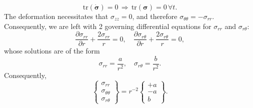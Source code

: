 \documentclass[12pt]{article}
\begin{document}
\begin{equation}
  \text{tr} (\dot{\boldsymbol{\sigma}}) = 0 \, \Rightarrow \, \text{tr} (\boldsymbol{\sigma}) = 0 \, \forall t.
\end{equation}
The deformation necessitates that $\sigma_{zz} = 0$, and therefore $\sigma_{\theta \theta} = - \sigma_{rr}$. Consequently, we are left with 2 governing differential equations for $\sigma_{rr}$ and $\sigma_{r \theta}$:
\begin{equation}
  \frac{\partial \sigma_{rr}}{\partial r} + \frac{2 \sigma_{rr}}{r} = 0, \quad \frac{\partial \sigma_{r\theta}}{\partial r} + \frac{2 \sigma_{r\theta}}{r} = 0,
\end{equation}
whose solutions are of the form
\begin{equation}
  \sigma_{rr} = \frac{a}{r^2}, \quad \sigma_{r\theta} = \frac{b}{r^2}.
\end{equation}
Consequently,
\begin{equation}
  \left\{ \begin{array}{c} \sigma_{rr} \\ \sigma_{\theta \theta} \\ \sigma_{r \theta} \end{array} \right\} = r^{-2} \left\{ \begin{array}{c} +a \\ -a \\ b \end{array} \right\}.
\end{equation}
\end{document}

